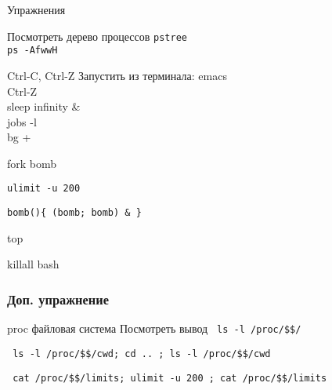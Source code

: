 \begin{frame}{Упражнения}
  \begin{block}{Посмотреть дерево процессов}
    {\tt pstree} \\
    {\tt ps -AfwwH}
  \end{block}
  \pause
  \begin{block}{Ctrl-C, Ctrl-Z}
    Запустить из терминала: emacs \\
    Ctrl-Z \\
    sleep infinity \& \\
    jobs -l \\
    bg +
  \end{block}
  \pause
  \begin{block}{fork bomb}

    {\tt ulimit -u 200} 

    {\tt bomb()\{ (bomb; bomb) \& \} }

    top

    killall bash

  \end{block}
\end{frame}

\begin{frame}[fragile]
  \frametitle{Доп. упражнение}
  \begin{block}{proc файловая система}
    Посмотреть вывод \verb+ ls -l /proc/$$/ +

    \verb+ ls -l /proc/$$/cwd; cd .. ; ls -l /proc/$$/cwd +
    
    \verb+ cat /proc/$$/limits; ulimit -u 200 ; cat /proc/$$/limits +

  \end{block}
\end{frame}


